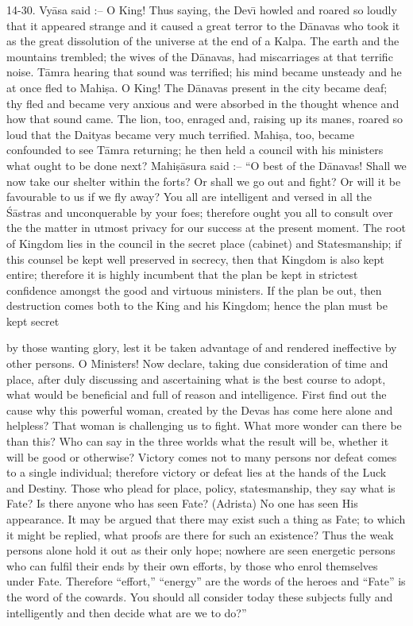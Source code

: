 14-30. Vy\=asa said :-- O King! Thus saying, the Dev\={\i} howled and roared so loudly that it appeared strange and it caused a great terror to the D\=anavas who took it as the great dissolution of the universe at the end of a Kalpa. The earth and the mountains trembled; the wives of the D\=anavas, had miscarriages at that terrific noise. T\=amra hearing that sound was terrified; his mind became unsteady and he at once fled to Mahi\d{s}a. O King! The D\=anavas present in the city became deaf; thy fled and became very anxious and were absorbed in the thought whence and how that sound came. The lion, too, enraged and, raising up its manes, roared so loud that the Daityas became very much terrified. Mahi\d{s}a, too, became confounded to see T\=amra returning; he then held a council with his ministers what ought to be done next? Mahi\d{s}\=asura said :-- ``O best of the D\=anavas! Shall we now take our shelter within the forts? Or shall we go out and fight? Or will it be favourable to us if we fly away? You all are intelligent and versed in all the \'S\=astras and unconquerable by your foes; therefore ought you all to consult over the the matter in utmost privacy for our success at the present moment. The root of Kingdom lies in the council in the secret place (cabinet) and Statesmanship; if this counsel be kept well preserved in secrecy, then that Kingdom is also kept entire; therefore it is highly incumbent that the plan be kept in strictest confidence amongst the good and virtuous ministers. If the plan be out, then destruction comes both to the King and his Kingdom; hence the plan must be kept secret

by those wanting glory, lest it be taken advantage of and rendered ineffective by other persons. O Ministers! Now declare, taking due consideration of time and place, after duly discussing and ascertaining what is the best course to adopt, what would be beneficial and full of reason and intelligence. First find out the cause why this powerful woman, created by the Devas has come here alone and helpless? That woman is challenging us to fight. What more wonder can there be than this? Who can say in the three worlds what the result will be, whether it will be good or otherwise? Victory comes not to many persons nor defeat comes to a single individual; therefore victory or defeat lies at the hands of the Luck and Destiny. Those who plead for place, policy, statesmanship, they say what is Fate? Is there anyone who has seen Fate? (Adrista) No one has seen His appearance. It may be argued that there may exist such a thing as Fate; to which it might be replied, what proofs are there for such an existence? Thus the weak persons alone hold it out as their only hope; nowhere are seen energetic persons who can fulfil their ends by their own efforts, by those who enrol themselves under Fate. Therefore ``effort,'' ``energy'' are the words of the heroes and ``Fate'' is the word of the cowards. You should all consider today these subjects fully and intelligently and then decide what are we to do?''


